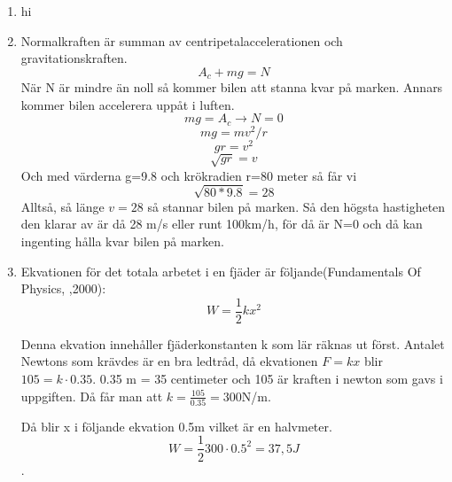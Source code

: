 \documentclass[a4paper,12pt]{article}
\begin{document}
\begin{enumerate}
    \item hi

    \item Normalkraften är summan av centripetalaccelerationen och gravitationskraften.
          $$A_c+mg=N$$
          När N är mindre än noll så kommer bilen att stanna kvar på marken. Annars
          kommer bilen accelerera uppåt i luften.
          $$mg=A_c\rightarrow N=0$$
          $$mg=mv^2/r$$
          $$gr=v^2$$
          $$\sqrt{gr}=v$$
          Och med värderna g=9.8 och krökradien r=80 meter så får vi
          $$\sqrt{80*9.8}=28$$
          Alltså, så länge $v=28$ så stannar bilen på marken. Så den högsta
          hastigheten den klarar av är då 28 m/s eller runt 100km/h, för då är N=0
          och då kan ingenting hålla kvar bilen på marken.

    \item Ekvationen för det totala arbetet i en fjäder är följande(Fundamentals Of Physics, ,2000):
    $$W=\frac{1}{2}kx^2$$
    
    Denna ekvation innehåller fjäderkonstanten k som lär räknas ut först.
    Antalet Newtons som krävdes är en bra ledtråd, då ekvationen $F=kx$ 
    blir $105=k\cdot 0.35$. 0.35 m = 35 centimeter och 105 är kraften i newton som 
    gavs i uppgiften. Då får man att $k=\frac{105}{0.35}=300$N/m.

    Då blir x i följande ekvation 0.5m vilket är en halvmeter. 
    $$W=\frac{1}{2}300\cdot 0.5^2=37,5J$$.

\end{enumerate}
\end{document}
